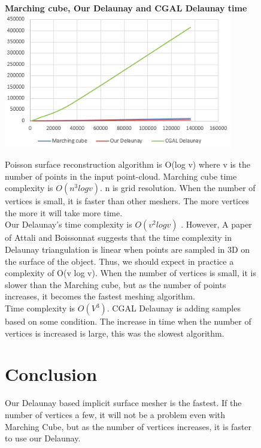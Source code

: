 \documentclass{jsarticle}
\begin{document}
\begin{figure}[h]
\begin{center}
\textbf{Marching cube, Our Delaunay and CGAL Delaunay time}
\includegraphics[width=10cm]{compare_mesher_graph.png}
\end{center}
Poisson surface reconstruction algorithm is O(log v) where v is the number of points in the input point-cloud. 
Marching cube time complexity is $O(n^3 log v)$. n is grid resolution. When the number of vertices is small, it is faster than other meshers. The more vertices the more it will take more time.\\
Our Delaunay's time complexity is $O(v^2 log v)$ . However, A paper of Attali and Boissonnat suggests that the time complexity in Delaunay triangulation is linear when points are sampled in 3D on the surface of the object. Thus, we should expect in practice a complexity of O(v log v). When the number of vertices is small, it is slower than the Marching cube, but as the number of points increases, it becomes the fastest meshing algorithm.\\
Time complexity is $O(V^3)$. CGAL Delaunay is adding samples based on some condition.  The increase in time when the number of vertices is increased is large, this was the slowest algorithm.
\section*{Conclusion}
Our Delaunay based implicit surface mesher is the fastest. If the number of vertices a few, it will not be a problem even with Marching Cube, but as the number of vertices increases, it is faster to use our Delaunay.
\end{figure}
\end{document}
